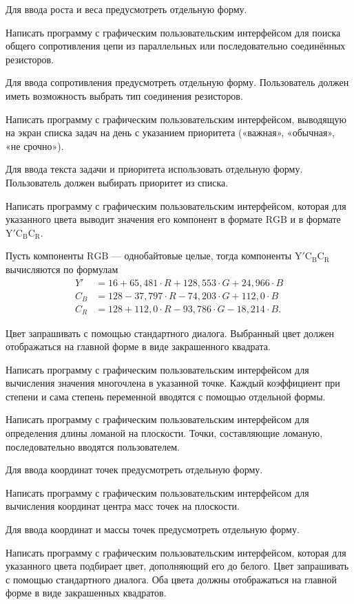 Для ввода роста и веса предусмотреть отдельную форму.

\task Написать программу с графическим пользовательским интерфейсом
для поиска общего сопротивления цепи из параллельных или
последовательно соединённых резисторов.

Для ввода сопротивления предусмотреть отдельную форму. Пользователь
должен иметь возможность выбрать тип соединения резисторов.

\task Написать программу с графическим пользовательским интерфейсом,
выводящую на экран списка задач на день с указанием приоритета
(«важная», «обычная», «не срочно»).

Для ввода текста задачи и приоритета использовать отдельную
форму. Пользователь должен выбирать приоритет из списка.

\task Написать программу с графическим пользовательским интерфейсом,
которая для указанного цвета выводит значения его компонент в формате
$\mathrm{RGB}$ и в формате $\mathrm{Y'C_BC_R}$.

Пусть компоненты $\mathrm{RGB}$ — однобайтовые целые, тогда компоненты
$\mathrm{Y'C_BC_R}$ вычисляются по формулам
\begin{align*}
  Y'  &=  16 +65{,}481 \cdot R + 128{,}553 \cdot G + 24{,}966 \cdot B\\
  C_B &= 128 -37{,}797 \cdot R - 74{,}203  \cdot G + 112{,}0  \cdot B\\
  C_R &= 128 +112{,}0  \cdot R - 93{,}786  \cdot G - 18{,}214 \cdot B.
\end{align*}

Цвет запрашивать с помощью стандартного диалога. Выбранный цвет должен
отображаться на главной форме в виде закрашенного квадрата.

\task Написать программу с графическим пользовательским интерфейсом
для вычисления значения многочлена в указанной точке. Каждый
коэффициент при степени и сама степень переменной вводятся с помощью
отдельной формы.

\task Написать программу с графическим пользовательским интерфейсом
для определения длины ломаной на плоскости. Точки, составляющие
ломаную, последовательно вводятся пользователем.

Для ввода координат точек предусмотреть отдельную форму. 

\task Написать программу с графическим пользовательским интерфейсом
для вычисления координат центра масс точек на плоскости.

Для ввода координат и массы точек предусмотреть отдельную форму.

\task Написать программу с графическим пользовательским интерфейсом,
которая для указанного цвета подбирает цвет, дополняющий его до
белого. Цвет запрашивать с помощью стандартного диалога. Оба цвета
должны отображаться на главной форме в виде закрашенных квадратов.



